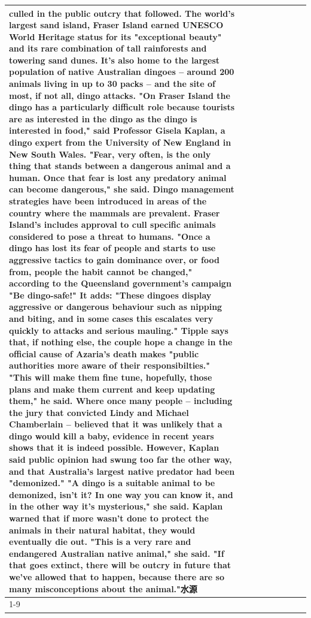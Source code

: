 \begin{table}[H]
\begin{tabular}{lllrlllll}
culled in the public outcry that followed. The world's largest sand island, Fraser Island earned UNESCO World Heritage status for its "exceptional beauty" and its rare combination of tall rainforests and towering sand dunes. It's also home to the largest population of native Australian dingoes -- around 200 animals living in up to 30 packs -- and the site of most, if not all, dingo attacks. "On Fraser Island the dingo has a particularly difficult role because tourists are as interested in the dingo as the dingo is interested in food," said Professor Gisela Kaplan, a dingo expert from the University of New England in New South Wales. "Fear, very often, is the only thing that stands between a dangerous animal and a human. Once that fear is lost any predatory animal can become dangerous," she said. Dingo management strategies have been introduced in areas of the country where the mammals are prevalent. Fraser Island's includes approval to cull specific animals considered to pose a threat to humans. "Once a dingo has lost its fear of people and starts to use aggressive tactics to gain dominance over, or food from, people the habit cannot be changed," according to the Queensland government's campaign "Be dingo-safe!" It adds: "These dingoes display aggressive or dangerous behaviour such as nipping and biting, and in some cases this escalates very quickly to attacks and serious mauling." Tipple says that, if nothing else, the couple hope a change in the official cause of Azaria's death makes "public authorities more aware of their responsibilties." "This will make them fine tune, hopefully, those plans and make them current and keep updating them," he said. Where once many people -- including the jury that convicted Lindy and Michael Chamberlain -- believed that it was unlikely that a dingo would kill a baby, evidence in recent years shows that it is indeed possible. However, Kaplan said public opinion had swung too far the other way, and that Australia's largest native predator had been "demonized." "A dingo is a suitable animal to be demonized, isn't it? In one way you can know it, and in the other way it's mysterious," she said. Kaplan warned that if more wasn't done to protect the animals in their natural habitat, they would eventually die out. "This is a very rare and endangered Australian native animal," she said. "If that goes extinct, there will be outcry in future that we've allowed that to happen, because there are so many misconceptions about the animal."水源 \\
\cline{1-9}

\end{tabular}
\end{table}
